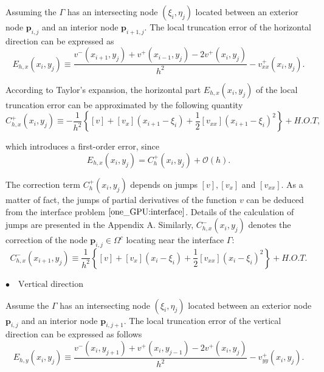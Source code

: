 Assuming the $\Gamma$ has an intersecting node $(\xi_{i}, \eta_{j})$ located between an exterior  node $\mathbf{p}_{i,j}$ and an interior node $\mathbf{p}_{i+1,j}$. The local truncation error of the horizontal direction can be expressed as
\begin{equation}
E_{h,x}\left(x_{i},y_{j}\right) \equiv \frac{v^{-}\left(x_{i+1},y_{j}\right)+v^{+}\left(x_{i-1},y_{j}\right)-2 v^{+}\left(x_{i},y_{j}\right)}{h^{2}}-v^{+}_{xx}\left(x_{i},y_{j}\right).
\end{equation}

According to Taylor's expansion, the horizontal part $E_{h, x}\left(x_{i}, y_{j}\right)$ of the local truncation error can be approximated by the following quantity
$$
C_{h, x}^{+}\left(x_{i}, y_{j}\right) \equiv -\frac{1}{h^{2}}\left\{[v]+\left[v_{x}\right]\left(x_{i+1}-\xi_{i}\right)+\frac{1}{2}\left[v_{x x}\right]\left(x_{i+1}-\xi_{i}\right)^{2}\right\} + H.O.T,
$$

which introduces a first-order error, since
$$
E_{h, x}\left(x_{i}, y_{j}\right)=C_{h}^{+}\left(x_{i}, y_{j}\right)+\mathcal{O}(h).
$$

The correction term $C^{+}_{h}(x_{i}, y_{j})$ depends on jumps $[v], [v_{x}]$ and $[v_{x x}]$. As a matter of fact, the jumps of partial derivatives of the function $v$ can be deduced from the interface problem $\eqref{one_GPU:interface}$. Details of the calculation of jumps are presented in the Appendix A. Similarly, $C^{-}_{h,x}(x_{i}, y_{j})$ denotes the correction of the node $\mathbf{p}_{i,j} \in \Omega^{c}$ locating near the interface $\Gamma$:
$$
C_{h, x}^{-}\left(x_{i+1}, y_{j}\right) \equiv \frac{1}{h^{2}}\left\{[v]+\left[v_{x}\right]\left(x_{i}-\xi_{i}\right)+\frac{1}{2}\left[v_{x x}\right]\left(x_{i}-\xi_{i}\right)^{2}\right\} + H.O.T.
$$

\noindent 
$\bullet \quad \text{Vertical direction}$

Assume the $\Gamma$ has an intersecting node $(\xi_{i}, \eta_{j})$ located between an exterior  node $\mathbf{p}_{i,j}$ and an interior node $\mathbf{p}_{i,j+1}$. The local truncation error of the vertical direction can be expressed as follows
\begin{equation}
E_{h,y}\left(x_{i},y_{j}\right) \equiv \frac{v^{-}\left(x_{i},y_{j+1}\right)+v^{+}\left(x_{i},y_{j-1}\right)-2 v^{+}\left(x_{i},y_{j}\right)}{h^{2}}-v^{+}_{yy}\left(x_{i},y_{j}\right).
\end{equation}

